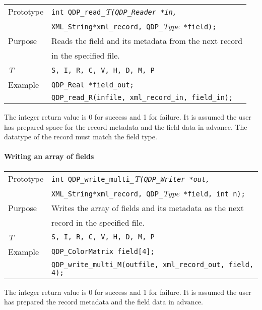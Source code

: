 \documentclass{article}
\newcommand{\allTypes}{{\tt S, I, R, C, V, H, D, M, P}}
\newcommand{\itt}{\it T}
\newcommand{\QMDhandle}{{\tt XML\_String}}
\begin{document}
\begin{flushleft}
  \begin{tabular}{|l|l|}
  \hline
  Prototype      & \verb|int QDP_read_|\itt\verb|(QDP_Reader *in,|\\
                 &  \QMDhandle \verb|*xml_record, QDP_|{\it Type}\verb| *field);|\\
    \hline
  Purpose        & Reads the field and its metadata from the next record \\
                 & in the specified file. \\
\hline
  \itt     & \allTypes \\
   \hline
  Example  & \verb|QDP_Real *field_out;| \\
           & \verb|QDP_read_R(infile, xml_record_in, field_in);| \\
   \hline
 \end{tabular}
\end{flushleft}
%
The integer return value is 0 for success and 1 for failure.  It is
assumed the user has prepared space for the record metadata and the
field data in advance.  The datatype of the record must match the
field type.

\paragraph{Writing an array of fields}

\begin{flushleft}
  \begin{tabular}{|l|l|}
  \hline
  Prototype      & \verb|int QDP_write_multi_|\itt\verb|(QDP_Writer *out, |\\
                 & \QMDhandle \verb|*xml_record, QDP_|{\it Type}\verb| *field, int n);|\\
    \hline
  Purpose        & Writes the array of fields and its metadata as the next \\
                 & record in the specified file. \\
\hline
  \itt     & \allTypes \\
   \hline
  Example  & \verb|QDP_ColorMatrix field[4];| \\
           & \verb|QDP_write_multi_M(outfile, xml_record_out, field, 4);| \\
   \hline
 \end{tabular}
\end{flushleft}
%
The integer return value is 0 for success and 1 for failure.  It is
assumed the user has prepared the record metadata and the field data
in advance.
\end{document}
